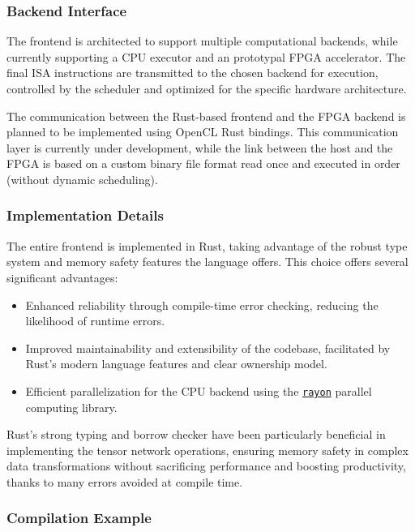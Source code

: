\documentclass[12pt,oneside,a4paper]{article}
\begin{document}
\subsubsection{Backend Interface}

The frontend is architected to support multiple computational backends, while currently supporting a CPU executor and an prototypal FPGA accelerator. The final ISA instructions are transmitted to the chosen backend for execution, controlled by the scheduler and optimized for the specific hardware architecture.

The communication between the Rust-based frontend and the FPGA backend is planned to be implemented using OpenCL Rust bindings. This communication layer is currently under development, while the link between the host and the FPGA is based on a custom binary file format read once and executed in order (without dynamic scheduling).

\subsubsection{Implementation Details}

The entire frontend is implemented in Rust, taking advantage of the robust type system and memory safety features the language offers. This choice offers several significant advantages:

\begin{itemize}
    \item Enhanced reliability through compile-time error checking, reducing the likelihood of runtime errors.
    \item Improved maintainability and extensibility of the codebase, facilitated by Rust's modern language features and clear ownership model.
    \item Efficient parallelization for the CPU backend using the \href{https://github.com/rayon-rs/rayon}{\texttt{rayon}} parallel computing library.
\end{itemize}

Rust's strong typing and borrow checker have been particularly beneficial in implementing the tensor network operations, ensuring memory safety in complex data transformations without sacrificing performance and boosting productivity, thanks to many errors avoided at compile time.

\subsubsection{Compilation Example}
\end{document}
